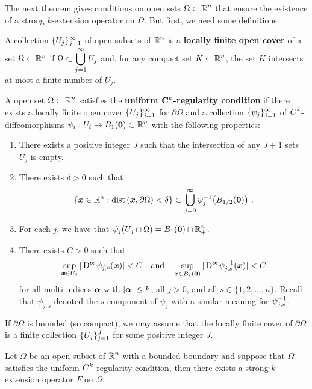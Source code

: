 The next theorem gives conditions on open sets
$\displaystyle \Omega \subset \mathbb{R}^n$
that ensure the existence of a strong $k$-extension operator on $\Omega$.
But first, we need some definitions.

\begin{defn}
A collection $\displaystyle \{ U_j \}_{j=1}^\infty$ of open subsets of
$\displaystyle \mathbb{R}^n$ is a {\bfseries locally finite open cover}%
 of a set
$\displaystyle \Omega \subset \mathbb{R}^n$ if
$\displaystyle \Omega \subset \bigcup_{j=1}^\infty U_j$ and,
for any compact set $\displaystyle K \subset \mathbb{R}^n$, the set $K$
intersects at most a finite number of $U_j$.
\end{defn}

\begin{defn} \label{UnifKregDefn}
A open set $\displaystyle \Omega \subset \mathbb{R}^n$ satisfies the
{\bfseries uniform $\displaystyle \mathbf C^k$-regularity condition}%
 if there exists
a locally finite open cover
$\displaystyle \{ U_j \}_{j=1}^\infty$ for $\partial \Omega$ and a collection 
$\displaystyle \{ \psi_j \}_{j=1}^\infty$ of $\displaystyle C^k$-diffeomorphisms 
$\displaystyle \psi_i: U_i \to B_{1}({\bm{0}}) \subset \mathbb{R}^n$ with the following
properties:
\begin{enumerate}
\item There exists a positive integer $J$ such that the intersection
of any $J+1$ sets $U_j$ is empty.
\item There exists $\delta >0$ such that
\[
\left\{ \VEC{x} \in \RR^n :
\dist{\VEC{x}}{\partial \Omega}  < \delta \right\}
\subset \bigcup_{j=0}^\infty \psi_j^{-1}\big(B_{1/2}(\VEC{0})\big) \ .
\]
\item For each $j$, we have that
$\displaystyle \psi_j(U_j\cap \Omega) = B_{1}({\bm{0}}) \cap \mathbb{R}^n_+$.
\item There exists $C>0$ such that
\[
\sup_{{\bm{x}}\in U_j} |\operatorname{D}^{{\bm{\alpha}}}\psi_{j,s}({\bm{x}})| < C
\quad \text{and} \quad
\sup_{{\bm{x}}\in B_{1}({\bm{0}})} |\operatorname{D}^{{\bm{\alpha}}}\psi^{-1}_{j,s}({\bm{x}})| < C
\]
for all multi-indices ${\bm{\alpha}}$ with $|{\bm{\alpha}}|\leq k$, all
$j > 0$, and all $s \in \{1,2,\ldots, n\}$.  Recall that
$\psi_{j,s}$ denoted the $s$ component of $\psi_j$ with a similar
meaning for $\displaystyle \psi^{-1}_{j,s}$.
\end{enumerate}
If $\partial \Omega$ is bounded (so compact), we may assume that
the locally finite cover of $\partial \Omega$ is a finite collection
$\displaystyle \{ U_j \}_{j=1}^J$ for some positive integer $J$.
\end{defn}

\begin{theorem} \label{sob_Omega_Ext}
Let $\Omega$ be an open subset of $\displaystyle \mathbb{R}^n$ with a bounded boundary
\footnotemark and suppose that $\Omega$ satisfies the uniform
$\displaystyle C^k$-regularity condition, then there exists a strong
$k$-extension operator $F$ on $\Omega$.
\end{theorem}

